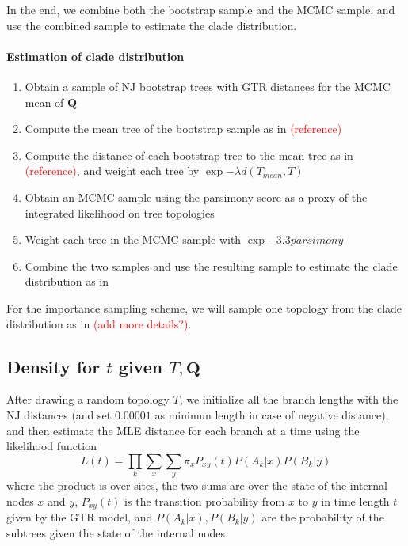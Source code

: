 \documentclass[useAMS,usenatbib]{biom}
\newcommand{\falta}[1]{\textcolor{red}{#1}}
\begin{document}
In the end, we combine both the bootstrap sample and the MCMC sample,
and use the combined sample to estimate the clade distribution.

\paragraph{Estimation of clade distribution}
\begin{enumerate}
\item{Obtain a sample of NJ bootstrap trees with GTR distances for the
    MCMC mean of $\mathbf{Q}$}
\item{Compute the mean tree of the bootstrap sample as in
    \falta{(reference)}}
\item{Compute the distance of each bootstrap tree to the mean tree as
    in \falta{(reference)}, and weight each tree by $\exp{-\lambda
      d(T_{mean},T)}$}
\item{Obtain an MCMC sample using the parsimony score as a proxy of
    the integrated likelihood on tree topologies}
\item{Weight each tree in the MCMC sample with $\exp{-3.3 parsimony}$}
\item{Combine the two samples and use the resulting sample to estimate
    the clade distribution as in \citep{Larget2013}}
\end{enumerate}

For the importance sampling scheme, we will sample one topology from
the clade distribution as in \citep{Larget2013} \falta{(add more
  details?)}.


\subsection{Density for $t$ given $T,\mathbf{Q}$}
After drawing a random topology $T$, we initialize all the branch
lengths with the NJ distances (and set $0.00001$ as minimun length in case
of negative distance), and then estimate the MLE distance for each
branch at a time using the likelihood function
\begin{equation}
L(t) = \prod_k \sum_x \sum_y \pi_x P_{xy}(t)P(A_k|x)P(B_k|y)
\end{equation}
where the product is over sites, the two sums are over the state of the
internal nodes $x$ and $y$, $P_{xy}(t)$ is the transition probability
from $x$ to $y$ in time length $t$ given by the GTR model, and
$P(A_k|x), P(B_k|y)$ are the probability of the subtrees given the
state of the internal nodes.
\end{document}
